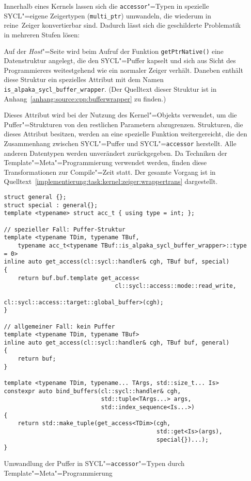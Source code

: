 Innerhalb eines Kernels lassen sich die \texttt{accessor}"=Typen in spezielle
SYCL"=eigene Zeigertypen (\texttt{multi\_ptr}) umwandeln, die wiederum in
\glqq reine\grqq\ Zeiger konvertierbar sind. Dadurch lässt sich die geschilderte
Problematik in mehreren Stufen lösen:

Auf der \textit{Host}"=Seite wird beim Aufruf der Funktion
\texttt{getPtrNative()} eine Datenstruktur angelegt, die den SYCL"=Puffer
kapselt und sich aus Sicht des Programmierers weitestgehend wie ein normaler
Zeiger verhält. Daneben enthält diese Struktur ein spezielles Attribut mit dem
Namen \texttt{is\_alpaka\_sycl\_buffer\_wrapper}. (Der Quelltext dieser Struktur
ist in Anhang~\ref{anhang:source:cpp:bufferwrapper} zu finden.)

Dieses Attribut wird bei der Nutzung des Kernel"=Objekts verwendet, um die
Puffer"=Strukturen von den restlichen Parametern abzugrenzen. Strukturen, die
dieses Attribut besitzen, werden an eine spezielle Funktion weitergereicht, die
den Zusammenhang zwischen SYCL"=Puffer und SYCL"=\texttt{accessor} herstellt.
Alle anderen Datentypen werden unverändert zurückgegeben. Da Techniken der
Template"=Meta"=Programmierung verwendet werden, finden diese Transformationen
zur Compile"=Zeit statt. Der gesamte Vorgang ist in
Quelltext~\ref{implementierung:task:kernel:zeiger:wrappertrans} dargestellt.

\begin{code}
    \begin{verbatim}
struct general {};
struct special : general{};
template <typename> struct acc_t { using type = int; };

// spezieller Fall: Puffer-Struktur
template <typename TDim, typename TBuf,
    typename acc_t<typename TBuf::is_alpaka_sycl_buffer_wrapper>::type = 0>
inline auto get_access(cl::sycl::handler& cgh, TBuf buf, special)
{
    return buf.buf.template get_access<
                                cl::sycl::access::mode::read_write,
                                cl::sycl::access::target::global_buffer>(cgh);
}

// allgemeiner Fall: kein Puffer
template <typename TDim, typename TBuf>
inline auto get_access(cl::sycl::handler& cgh, TBuf buf, general)
{
    return buf;
}

template <typename TDim, typename... TArgs, std::size_t... Is>
constexpr auto bind_buffers(cl::sycl::handler& cgh,
                            std::tuple<TArgs...> args,
                            std::index_sequence<Is...>)
{
    return std::make_tuple(get_access<TDim>(cgh,
                                            std::get<Is>(args),
                                            special{})...);
}
    \end{verbatim}
    \caption{Umwandlung der Puffer in SYCL"=\texttt{accessor}"=Typen durch
             Template"=Meta"=Programmierung}
    \label{implementierung:task:kernel:zeiger:wrappertrans}
\end{code}


